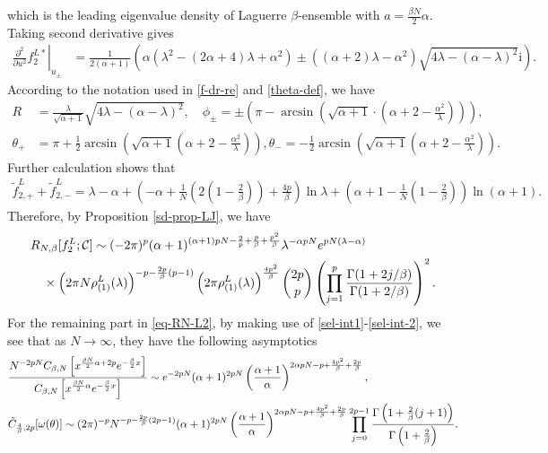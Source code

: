 \documentclass[11pt,a4paper]{article}
\numberwithin{equation}{section} %
\theoremstyle{plain}
\theoremstyle{definition}
\numberwithin{prop}{section}
\numberwithin{cor}{section}
\numberwithin{remark}{section}
\begin{document}
which is the leading eigenvalue density of Laguerre $\beta$-ensemble with $a=\frac{\beta N}{2}\alpha$. Taking second derivative gives
\begin{align*}
    \left.\frac{\partial^2}{\partial u^2}f^{L*}_2\right|_{u_{ \pm}} & =\frac{1}{2(\alpha+1)}\left(\alpha\left(\lambda^2-(2 \alpha+4) \lambda+\alpha^2\right)\pm\left((\alpha+2) \lambda-\alpha^2\right) \sqrt{4 \lambda-(\alpha-\lambda)^2} \mathrm{i}\right).
\end{align*}
According to the notation used in \eqref{f-dr-re} and \eqref{theta-def}, we have
\begin{align*}
    R & =\frac{\lambda}{\sqrt{\alpha+1}} \sqrt{4 \lambda-(\alpha-\lambda)^2}, \quad \phi_{ \pm}= \pm\left(\pi-\arcsin \left(\sqrt{\alpha+1} \cdot\left(\alpha+2-\frac{\alpha^2}{\lambda}\right)\right)\right), \\ \theta_{+} & =\pi+\frac{1}{2} \arcsin \left(\sqrt{\alpha+1}\left(\alpha+2-\frac{\alpha^2}{\lambda}\right)\right), \theta_{-}=-\frac{1}{2} \arcsin \left(\sqrt{\alpha+1}\left(\alpha+2-\frac{\alpha^2}{\lambda}\right)\right).
\end{align*}
Further calculation shows that
\begin{align*}
    \tilde{f}^L_{2,+}+\tilde{f}^L_{2,-} =\lambda-\alpha+\left(-\alpha+\frac{1}{N}\left(2\left(1-\frac{2}{\beta}\right)\right)+\frac{4 p}{\beta}\right) \ln \lambda+\left(\alpha+1-\frac{1}{N}\left(1-\frac{2}{\beta}\right)\right) \ln (\alpha+1).
\end{align*}
Therefore, by Proposition \ref{sd-prop-LJ}, we have
\begin{align*}
    &R_{N,\beta}[f^L_2;\mathcal{C}]\sim (-2\pi )^p (\alpha+1)^{(\alpha+1)pN-{2\over p}+\frac{p}{\beta}+\frac{p^2}{\beta}}\lambda^{-\alpha pN}e^{pN(\lambda-\alpha)} \\
    &\quad \times\left(2\pi N\rho_{(1)}^L(\lambda)\right)^{-p-\frac{2p}{\beta}(p-1)}\left(2\pi \rho_{(1)}^L(\lambda)\right)^{\frac{4p^2}{\beta}}\binom{2p}{p}\left(\prod_{j=1}^{p}\frac{\Gamma(1+2j/\beta)}{\Gamma(1+2/\beta) } \right)^2.
\end{align*}
For the remaining part in \eqref{eq-RN-L2}, by making use of \eqref{sel-int1}-\eqref{sel-int-2}, we see that as $N\to \infty$, they have the following  asymptotics
\begin{align*}
    &\frac{N^{-2pN}  C_{\beta, N}\left[x^{{\beta N\over2}\alpha+2 p} e^{-\frac{\beta}{2} x}\right]}{C_{\beta, N}\left[x^{{\beta N\over2}\alpha} e^{-\frac{\beta}{2} x}\right]}\sim e^{-2pN}(\alpha+1)^{2pN}\left(\frac{\alpha+1}{\alpha}\right)^{2\alpha pN-p+\frac{4p^2}{\beta}+\frac{2p}{\beta}},\\
    &\tilde{C}_{{4\over\beta},2p}[\omega(\theta)]\sim (2\pi)^{-p}N^{-p-\frac{2p}{\beta}(2p-1)}(\alpha+1)^{2pN}\left(\frac{\alpha+1}{\alpha}\right)^{2\alpha pN-p+\frac{4p^2}{\beta}+\frac{2p}{\beta}}\prod_{j=0}^{2p-1}\frac{\Gamma\left(1+{2\over\beta}(j+1)\right)}{\Gamma\left(1+\frac{2}{\beta}\right)}.
\end{align*}
\end{document}
